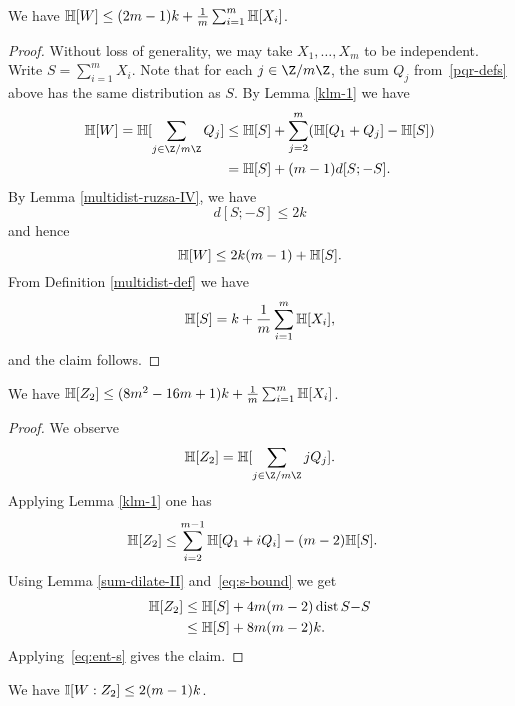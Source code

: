\begin{lemma}[Entropy of $W$]\label{ent-w}  We have $\mathbb{H}[W] \leq (2m-1)k + \frac1m \sum_{i=1}^m \mathbb{H}[X_i]$.
\end{lemma}

\begin{proof} Without loss of generality, we may take $X_1,\dots,X_m$ to be independent. Write $S = \sum_{i=1}^m X_i$.
  Note that for each $j \in \Z/m\Z$, the sum $Q_j$ from~\eqref{pqr-defs} above has the same distribution as $S$.
  By Lemma \ref{klm-1} we have
  \begin{align*}
    \bbH[W] = \bbH[\sum_{j \in \Z/m\Z} Q_j]  & \leq \bbH[S] + \sum_{j=2}^m (\bbH[Q_1+Q_j] - \bbH[S]) \\ & = \bbH[S] + (m-1) d[S;-S].
  \end{align*}
  By Lemma \ref{multidist-ruzsa-IV}, we have
  \begin{equation}
    \label{eq:s-bound}
    d[S; -S] \leq 2 k
  \end{equation}
  and hence
  \[
    \mathbb{H}[W] \leq 2 k (m-1) + \mathbb{H}[S].
  \]
  From Definition \ref{multidist-def} we have
  \begin{equation}
    \label{eq:ent-s}
    \mathbb{H}[S] = k + \frac1m \sum_{i=1}^m \mathbb{H}[X_i],
  \end{equation}
  and the claim follows.
\end{proof}

\begin{lemma}[Entropy of $Z_2$]\label{ent-z2}  We have $\mathbb{H}[Z_2] \leq (8m^2-16m+1) k + \frac{1}{m} \sum_{i=1}^m \mathbb{H}[X_i]$.
\end{lemma}

\begin{proof}
  We observe
  \[
    \bbH[Z_2] = \bbH[\sum_{j \in \Z/m\Z} j Q_j].
  \]
  Applying Lemma \ref{klm-1} one has
  \begin{align*}
    \mathbb{H}[Z_2] &\leq \sum_{i=2}^{m-1} \mathbb{H}[Q_1 + i Q_i]  - (m-2) \mathbb{H}[S].
  \end{align*}
  Using Lemma \ref{sum-dilate-II} and~\eqref{eq:s-bound} we get
  \begin{align*}
    \mathbb{H}[Z_2]
              &\leq \mathbb{H}[S] + 4m (m-2) \operatorname{dist}{S}{-S} \\
              &\leq \mathbb{H}[S] + 8m (m-2) k.
  \end{align*}
  Applying~\eqref{eq:ent-s} gives the claim.
\end{proof}

\begin{lemma}\label{mutual-w-z2}  We have  $\mathbb{I}[W : Z_2] \leq 2 (m-1) k$.
\end{lemma}

